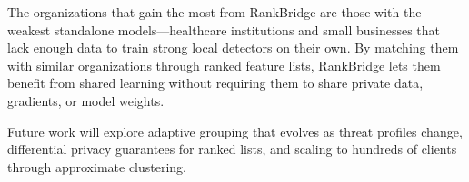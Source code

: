 \documentclass[information,article,submit,pdftex]{mdpi}
\begin{document}
The organizations that gain the most from RankBridge are those with the weakest
standalone models---healthcare institutions and small businesses that lack enough
data to train strong local detectors on their own. By matching them with similar
organizations through ranked feature lists, RankBridge lets them benefit from
shared learning without requiring them to share private data, gradients, or model
weights.

Future work will explore adaptive grouping that evolves as threat profiles change,
differential privacy guarantees for ranked lists, and scaling to hundreds of
clients through approximate clustering.








\end{document}
